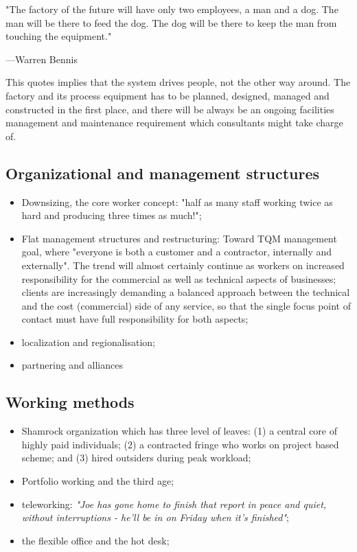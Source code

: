 \documentclass[a4paper,twoside,11pt]{article}
\begin{document}
\epigraph{"The factory of the future will have only two employees, a man and a dog. The man will be there to feed the dog. The dog will be there to keep the man from touching the equipment." }{---Warren Bennis}

This quotes implies that the system drives people, not the other way around. The factory and its process equipment has to be planned, designed, managed and constructed in the first place, and there will be always be an ongoing facilities management and maintenance requirement which consultants might take charge of.

\subsection{Organizational and management structures}
\begin{itemize}
\item Downsizing, the core worker concept: "half as many staff working twice as hard and producing three times as much!";
\item Flat management structures and restructuring: Toward TQM management goal, where "everyone is both a customer and a contractor, internally and externally". The trend will almost certainly continue as workers on increased responsibility for the commercial as well as technical aspects of businesses; clients are increasingly demanding a balanced approach between the technical and the cost (commercial) side of any service, so that the single focus point of contact must have full responsibility for both aspects;
\item localization and regionalisation;
\item partnering and alliances
\end{itemize}

\subsection{Working methods}
\begin{itemize}
\item Shamrock organization which has three level of leaves: (1) a central core of highly paid individuals; (2) a contracted fringe who works on project based scheme; and (3) hired outsiders during peak workload;
\item Portfolio working and the third age;
\item teleworking: \textit{"Joe has gone home to finish that report in peace and quiet, without interruptions - he'll be in on Friday when it's finished"};
\item the flexible office and the hot desk;
\end{itemize}
\end{document}
